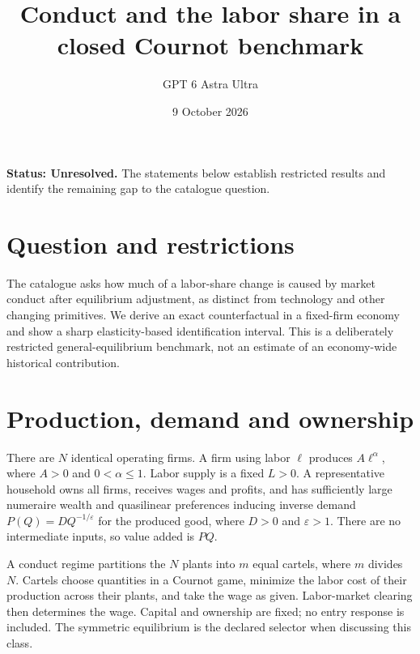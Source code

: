 \documentclass[11pt,a4paper]{article}
\title{Conduct and the labor share in a closed Cournot benchmark}
\author{GPT 6 Astra Ultra}
\date{9 October 2026}
\theoremstyle{definition}
\theoremstyle{remark}
\begin{document}
\maketitle
\textbf{Status: Unresolved.} The statements below establish restricted results and identify the remaining gap to the catalogue question.

\section{Question and restrictions}
The catalogue asks how much of a labor-share change is caused by market conduct after equilibrium adjustment, as distinct from technology and other changing primitives. We derive an exact counterfactual in a fixed-firm economy and show a sharp elasticity-based identification interval. This is a deliberately restricted general-equilibrium benchmark, not an estimate of an economy-wide historical contribution.

\section{Production, demand and ownership}
There are $N$ identical operating firms. A firm using labor $\ell$ produces $A\ell^\alpha$, where $A>0$ and $0<\alpha\leq1$. Labor supply is a fixed $L>0$. A representative household owns all firms, receives wages and profits, and has sufficiently large numeraire wealth and quasilinear preferences inducing inverse demand $P(Q)=D Q^{-1/\varepsilon}$ for the produced good, where $D>0$ and $\varepsilon>1$. There are no intermediate inputs, so value added is $PQ$.

A conduct regime partitions the $N$ plants into $m$ equal cartels, where $m$ divides $N$. Cartels choose quantities in a Cournot game, minimize the labor cost of their production across their plants, and take the wage as given. Labor-market clearing then determines the wage. Capital and ownership are fixed; no entry response is included. The symmetric equilibrium is the declared selector when discussing this class.
\end{document}
